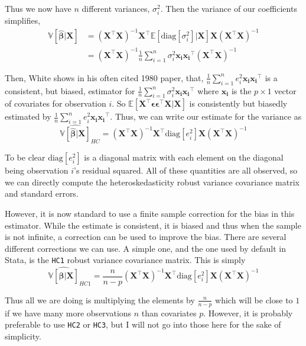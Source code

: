 \documentclass[]{article}
\begin{document}
Thus we now have \(n\) different variances, \(\sigma^2_i\). Then the
variance of our coefficients simplifies, \[
\begin{aligned}
\mathbb{V}[\hat{\bm{\beta}}|\mathbf{X}] &= (\mathbf{X}^\top \mathbf{X})^{-1} \mathbf{X}^\top \mathbb{E}[\text{diag}[\sigma^2_i] |\mathbf{X}] \mathbf{X}(\mathbf{X}^\top \mathbf{X})^{-1} \\
 &= (\mathbf{X}^\top \mathbf{X})^{-1} \frac{1}{n} \sum^n_{i=1} \sigma^2_i \mathbf{x_i}\mathbf{x_i}^\top (\mathbf{X}^\top \mathbf{X})^{-1}
\end{aligned}
\]

Then, White shows in his often cited 1980 paper, that,
\(\frac{1}{n} \sum^n_{i=1} e^2_i \mathbf{x_i}\mathbf{x_i}^\top\) is a
consistent, but biased, estimator for
\(\frac{1}{n} \sum^n_{i=1} \sigma^2_i \mathbf{x_i}\mathbf{x_i}^\top\)
where \(\mathbf{x_i}\) is the \(p \times 1\) vector of covariates for
observation \(i\). So
\(\mathbb{E}[\mathbf{X}^\top \bm{\epsilon}\bm{\epsilon}^\top \mathbf{X}|\mathbf{X}]\)
is consistently but biasedly estimated by
\(\frac{1}{n} \sum^n_{i=1} e^2_i \mathbf{x_i}\mathbf{x_i}^\top\). Thus,
we can write our estimate for the variance as
\[\widehat{\mathbb{V}[\hat{\bm{\beta}}|\mathbf{X}]}_{HC} = (\mathbf{X}^\top \mathbf{X})^{-1} \mathbf{X}^\top \text{diag}[e_i^2] \mathbf{X}(\mathbf{X}^\top \mathbf{X})^{-1}\]

To be clear \(\text{diag}[e_i^2]\) is a diagonal matrix with each
element on the diagonal being observation \(i\)'s residual squared. All
of these quantities are all observed, so we can directly compute the
heteroskedasticity robust variance covariance matrix and standard
errors.

However, it is now standard to use a finite sample correction for the
bias in this estimator. While the estimate is consistent, it is biased
and thus when the sample is not infinite, a correction can be used to
improve the bias. There are several different corrections we can use. A
simple one, and the one used by default in Stata, is the \texttt{HC1}
robust variance covariance matrix. This is simply
\[\widehat{\mathbb{V}[\hat{\bm{\beta}}|\mathbf{X}]}_{HC1} = \frac{n}{n-p}(\mathbf{X}^\top \mathbf{X})^{-1} \mathbf{X}^\top \text{diag}[e_i^2] \mathbf{X}(\mathbf{X}^\top \mathbf{X})^{-1}\]

Thus all we are doing is multiplying the elements by \(\frac{n}{n-p}\)
which will be close to \(1\) if we have many more observations \(n\)
than covariates \(p\). However, it is probably preferable to use
\texttt{HC2} or \texttt{HC3}, but I will not go into those here for the
sake of simplicity.
\end{document}
